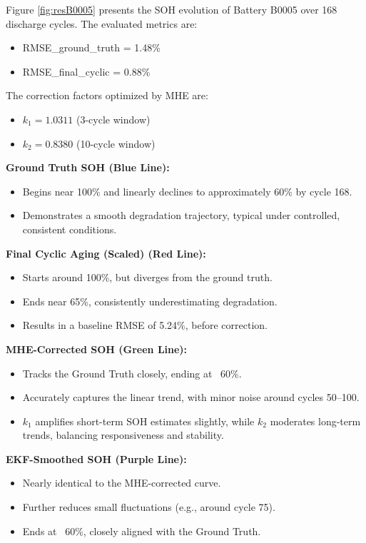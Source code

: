 Figure \ref{fig:resB0005} presents the SOH evolution of Battery B0005 over 168 discharge cycles. The evaluated metrics are: 
\begin{itemize}
    \item RMSE\_ground\_truth = 1.48\%
    \item RMSE\_final\_cyclic = 0.88\%
\end{itemize}
The correction factors optimized by MHE are:
\begin{itemize}
    \item $k_1 = 1.0311$ (3-cycle window)
    \item $k_2 = 0.8380$ (10-cycle window)
\end{itemize}

\vspace{0.5em}
\textbf{Ground Truth SOH (Blue Line):}
\begin{itemize}
    \item Begins near 100\% and linearly declines to approximately 60\% by cycle 168.
    \item Demonstrates a smooth degradation trajectory, typical under controlled, consistent conditions.
\end{itemize}

\vspace{0.5em}
\textbf{Final Cyclic Aging (Scaled) (Red Line):}
\begin{itemize}
    \item Starts around 100\%, but diverges from the ground truth.
    \item Ends near 65\%, consistently underestimating degradation.
    \item Results in a baseline RMSE of 5.24\%, before correction.
\end{itemize}

\vspace{0.5em}
\textbf{MHE-Corrected SOH (Green Line):}
\begin{itemize}
    \item Tracks the Ground Truth closely, ending at ~60\%.
    \item Accurately captures the linear trend, with minor noise around cycles 50--100.
    \item $k_1$ amplifies short-term SOH estimates slightly, while $k_2$ moderates long-term trends, balancing responsiveness and stability.
\end{itemize}

\vspace{0.5em}
\textbf{EKF-Smoothed SOH (Purple Line):}
\begin{itemize}
    \item Nearly identical to the MHE-corrected curve.
    \item Further reduces small fluctuations (e.g., around cycle 75).
    \item Ends at ~60\%, closely aligned with the Ground Truth.
\end{itemize}

